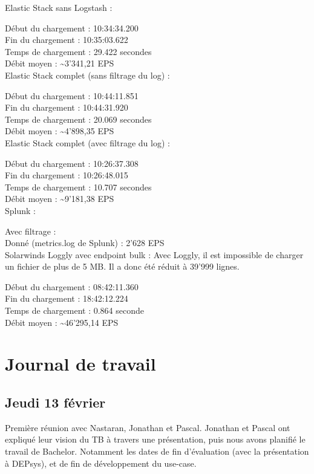 \documentclass[paper=a4, fontsize=11pt]{scrartcl}
\begin{document}
Elastic Stack sans Logstash :

Début du chargement : 10:34:34.200 \\
Fin du chargement : 10:35:03.622 \\
Temps de chargement : 29.422 secondes \\
Débit moyen : \textasciitilde 3'341,21 EPS \\

Elastic Stack complet (sans filtrage du log) :

Début du chargement : 10:44:11.851 \\
Fin du chargement : 10:44:31.920 \\
Temps de chargement : 20.069 secondes \\
Débit moyen : \textasciitilde 4'898,35 EPS \\

Elastic Stack complet (avec filtrage du log) :

Début du chargement : 10:26:37.308 \\
Fin du chargement : 10:26:48.015 \\
Temps de chargement : 10.707 secondes \\
Débit moyen : \textasciitilde 9'181,38 EPS \\

Splunk :

Avec filtrage : \\
Donné (metrics.log de Splunk) : 2'628 EPS \\

Solarwinds Loggly avec endpoint bulk :
Avec Loggly, il est impossible de charger un fichier de plus de 5 MB. Il a donc été réduit à 39'999 lignes.

Début du chargement : 08:42:11.360 \\
Fin du chargement : 18:42:12.224 \\
Temps de chargement : 0.864 seconde \\
Débit moyen : \textasciitilde 46'295,14 EPS \\

\section{Journal de travail}


\subsection{Jeudi 13 février}
    Première réunion avec Nastaran, Jonathan et Pascal. Jonathan et Pascal ont expliqué leur vision du TB à travers une présentation, puis nous avons planifié le travail de Bachelor. Notamment les dates de fin d'évaluation (avec la présentation à DEPsys), et de fin de développement du use-case.
\end{document}
